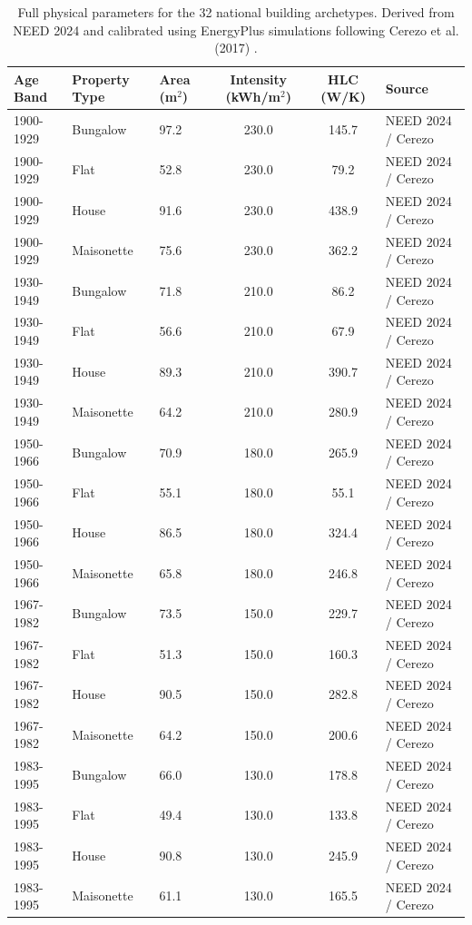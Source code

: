 \documentclass[11pt, a4paper, twocolumn, numbers]{elsarticle}
\begin{document}
\begin{table}[t]
\centering
\caption{Full physical parameters for the 32 national building archetypes. Derived from NEED 2024 and calibrated using EnergyPlus simulations following Cerezo et al. (2017) \cite{Cerezo2017}.} \label{tab:archetypes}
\begin{tabular}{lllccl}
\toprule
Age Band & Property Type & Area (m$^2$) & Intensity (kWh/m$^2$) & HLC (W/K) & Source \\
\midrule
1900-1929 & Bungalow & 97.2 & 230.0 & 145.7 & NEED 2024 / Cerezo \\
1900-1929 & Flat & 52.8 & 230.0 & 79.2 & NEED 2024 / Cerezo \\
1900-1929 & House & 91.6 & 230.0 & 438.9 & NEED 2024 / Cerezo \\
1900-1929 & Maisonette & 75.6 & 230.0 & 362.2 & NEED 2024 / Cerezo \\
1930-1949 & Bungalow & 71.8 & 210.0 & 86.2 & NEED 2024 / Cerezo \\
1930-1949 & Flat & 56.6 & 210.0 & 67.9 & NEED 2024 / Cerezo \\
1930-1949 & House & 89.3 & 210.0 & 390.7 & NEED 2024 / Cerezo \\
1930-1949 & Maisonette & 64.2 & 210.0 & 280.9 & NEED 2024 / Cerezo \\
1950-1966 & Bungalow & 70.9 & 180.0 & 265.9 & NEED 2024 / Cerezo \\
1950-1966 & Flat & 55.1 & 180.0 & 55.1 & NEED 2024 / Cerezo \\
1950-1966 & House & 86.5 & 180.0 & 324.4 & NEED 2024 / Cerezo \\
1950-1966 & Maisonette & 65.8 & 180.0 & 246.8 & NEED 2024 / Cerezo \\
1967-1982 & Bungalow & 73.5 & 150.0 & 229.7 & NEED 2024 / Cerezo \\
1967-1982 & Flat & 51.3 & 150.0 & 160.3 & NEED 2024 / Cerezo \\
1967-1982 & House & 90.5 & 150.0 & 282.8 & NEED 2024 / Cerezo \\
1967-1982 & Maisonette & 64.2 & 150.0 & 200.6 & NEED 2024 / Cerezo \\
1983-1995 & Bungalow & 66.0 & 130.0 & 178.8 & NEED 2024 / Cerezo \\
1983-1995 & Flat & 49.4 & 130.0 & 133.8 & NEED 2024 / Cerezo \\
1983-1995 & House & 90.8 & 130.0 & 245.9 & NEED 2024 / Cerezo \\
1983-1995 & Maisonette & 61.1 & 130.0 & 165.5 & NEED 2024 / Cerezo \\

\end{tabular}
\end{table}
\end{document}
